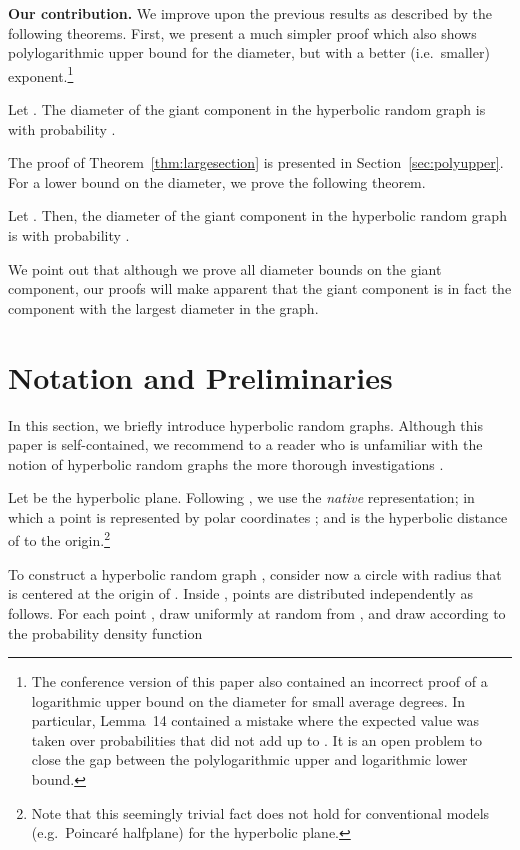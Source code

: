 \documentclass{llncs}
\newcommand{\thmref}[1]{Theorem~\ref{thm:#1}}
\newcommand{\secref}[1]{Section~\ref{sec:#1}}
\begin{document}
\textbf{Our contribution.}
We improve upon the previous results as described by the following theorems.
First, we present a much simpler proof which also shows polylogarithmic upper bound for the diameter,
but with a better (i.e.\ smaller) exponent.\footnote{The conference version of this paper \cite{DBLP:conf/icalp/FriedrichK15} also contained an incorrect proof of a logarithmic upper bound on the diameter for small average degrees. In particular, Lemma~14 contained a mistake where the expected value was taken over probabilities  that did not add up to .
It is an open problem to close the gap between the polylogarithmic upper and logarithmic lower bound. }
\begin{theorem}
\label{thm:largesection}
Let . The diameter of the giant component in the hyperbolic random graph  is  with probability .
\end{theorem}
The proof of \thmref{largesection} is presented in \secref{polyupper}.
For a lower bound on the diameter, we prove the following theorem.
\begin{theorem}
\label{thm:lowerbound}
Let . Then, the diameter of the giant component in the hyperbolic random graph  is  with probability .
\end{theorem}
We point out that although we prove all diameter bounds on the giant component, our proofs will make apparent that the giant component is in fact the component with the largest diameter in the graph.
\medskip



\section{Notation and Preliminaries}
In this section, we briefly introduce hyperbolic random graphs. Although this paper is self-contained, we recommend to a reader who is unfamiliar with the notion of hyperbolic random graphs the more thorough investigations \cite{krioukov2010hyperbolic,gugelmann2012random}. 

Let  be the hyperbolic plane. Following \cite{krioukov2010hyperbolic}, we use the {\em native} representation; in which a point  is represented by polar coordinates ; and  is the hyperbolic distance of  to the origin.\footnote{Note that this seemingly trivial fact does not hold for conventional models (e.g.\ Poincar\'e halfplane) for the hyperbolic plane.}

To construct a hyperbolic random graph , consider now a circle  with radius  that is centered at the origin of . Inside ,  points are distributed independently as follows. For each point , draw  uniformly at random from , and draw  according to the probability density function
\end{document}
